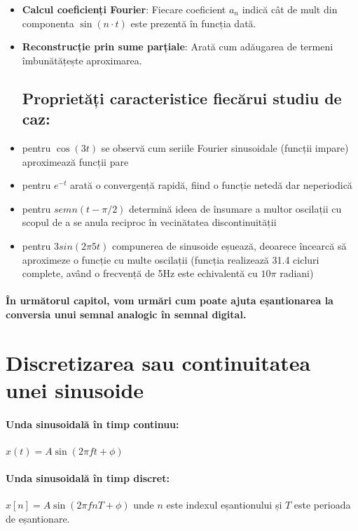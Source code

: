 \documentclass{article}
\begin{document}
\begin{itemize}
    \subsection*{Observații:}
    \item \textbf{Calcul coeficienți Fourier}: Fiecare coeficient $a_n$ indică cât de mult din componenta $\sin(n\cdot t)$ este prezentă în funcția dată.
    \item \textbf{Reconstrucție prin sume parțiale}: Arată cum adăugarea de termeni îmbunătățește aproximarea.

    \subsection*{Proprietăți caracteristice fiecărui studiu de caz:}
    \item pentru \(\cos(3t)\) se observă cum seriile Fourier sinusoidale (funcții impare) aproximează funcții pare
    \item pentru \(e^{-t}\) arată o convergență rapidă, fiind o funcție netedă dar neperiodică
    \item pentru \(semn(t-\pi/2)\) determină ideea de însumare a multor oscilații cu scopul de a se anula reciproc în vecinătatea discontinuității
    \item pentru \(3sin(2\pi5t)\) compunerea de sinusoide eșuează, deoarece încearcă să aproximeze o funcție cu multe oscilații (funcția realizează 31.4 cicluri complete, având o frecvență de 5Hz este echivalentă cu \(10\pi\) radiani)
\end{itemize}

\paragraph{În următorul capitol, vom urmări cum poate ajuta eșantionarea la conversia unui semnal analogic în semnal digital.}

\section*{Discretizarea sau continuitatea unei sinusoide}

\paragraph{Unda sinusoidală în timp continuu:} \(x(t) = A\sin(2\pi ft+\phi)\)

\paragraph{Unda sinusoidală în timp discret:} \(x[n] = A\sin(2\pi fnT+\phi)\) unde \(n\) este indexul eșantionului și \(T\) este perioada de eșantionare.
\end{document}
